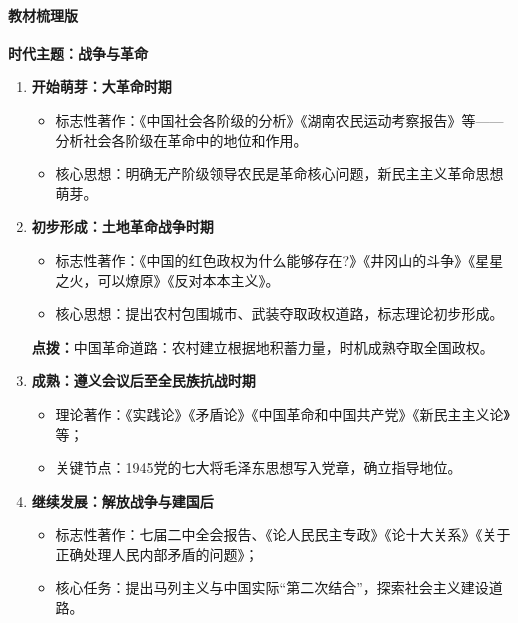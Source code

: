 \paragraph{教材梳理版}
\textbf{时代主题：战争与革命}
\begin{enumerate}
    \item \textbf{开始萌芽：大革命时期}
    \begin{itemize}
        \item 标志性著作：《中国社会各阶级的分析》《湖南农民运动考察报告》等——分析社会各阶级在革命中的地位和作用。
        \item 核心思想：明确无产阶级领导农民是革命核心问题，新民主主义革命思想萌芽。
    \end{itemize}

    \item \textbf{初步形成：土地革命战争时期}
    \begin{itemize}
        \item 标志性著作：《中国的红色政权为什么能够存在?》《井冈山的斗争》《星星之火，可以燎原》《反对本本主义》。
        \item 核心思想：提出农村包围城市、武装夺取政权道路，标志理论初步形成。
    \end{itemize}
    \vspace{0.4em}
    \noindent\sloppy\colorbox{orange!10}{
        \begin{minipage}{0.92\textwidth}
            \textbf{点拨：}中国革命道路：农村建立根据地积蓄力量，时机成熟夺取全国政权。
        \end{minipage}
    }
    \vspace{0.4em}

    \item \textbf{\color{red}成熟：遵义会议后至全民族抗战时期}
    \begin{itemize}
        \item 理论著作：《实践论》《矛盾论》《中国革命和中国共产党》《新民主主义论》等；
        \item 关键节点：1945党的七大将毛泽东思想写入党章，确立指导地位。
    \end{itemize}

    \item \textbf{\color{red}继续发展：解放战争与建国后}
    \begin{itemize}
        \item 标志性著作：七届二中全会报告、《论人民民主专政》《论十大关系》《关于正确处理人民内部矛盾的问题》；
        \item 核心任务：提出马列主义与中国实际“第二次结合”，探索社会主义建设道路。
    \end{itemize}
\end{enumerate}

